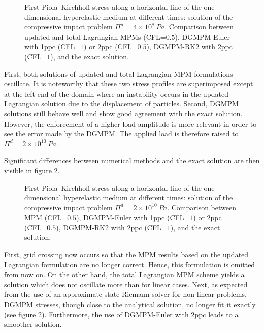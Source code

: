 \begin{figure}[h!]
  \centering
  {}
  \caption{First Piola–Kirchhoff stress along a horizontal line of the one-dimensional hyperelastic medium at different times: solution of the compressive impact problem $\Pi^d= 4\times 10^{8} \: Pa$. Comparison between updated and total Lagrangian MPMs (CFL=$0.5$), DGMPM-Euler with 1ppc (CFL=$1$) or 2ppc (CFL=$0.5$), DGMPM-RK2 with 2ppc (CFL=$1$), and the exact solution.}
  \label{fig:he_rarefaction_UL}
\end{figure}
First, both solutions of updated and total Lagrangian MPM formulations oscillate.
It is noteworthy that these two stress profiles are superimposed except at the left end of the domain where an instability occurs in the updated Lagrangian solution due to the displacement of particles.
Second, DGMPM solutions still behave well and show good agreement with the exact solution. However, the enforcement of a higher load amplitude is more relevant in order to see the error made by the DGMPM.
The applied load is therefore raised to $\Pi^d= 2\times 10^{10} \: Pa$.

Significant differences between numerical methods and the exact solution are then visible in figure \ref{fig:he_rarefaction}.
\begin{figure}[h!]
  \centering
  {}
  {}
  {}
  \caption{First Piola–Kirchhoff stress along a horizontal line of the one-dimensional hyperelastic medium at different times: solution of the compressive impact problem $\Pi^d= 2\times 10^{10} \: Pa$. Comparison between MPM (CFL=$0.5$), DGMPM-Euler with 1ppc (CFL=$1$) or 2ppc (CFL=$0.5$), DGMPM-RK2 with 2ppc (CFL=$1$), and the exact solution.}
  \label{fig:he_rarefaction}
\end{figure}
First, grid crossing now occurs so that the MPM results based on the updated Lagrangian formulation are no longer correct. Hence, this formulation is omitted from now on.
On the other hand, the total Lagrangian MPM scheme yields a solution which does not oscillate more than for linear cases.
Next, as expected from the use of an approximate-state Riemann solver for non-linear problems, DGMPM stresses, though close to the analytical solution, no longer fit it exactly (see figure \ref{fig:he_rarefaction}).
Furthermore, the use of DGMPM-Euler with 2ppc leads to a smoother solution.


